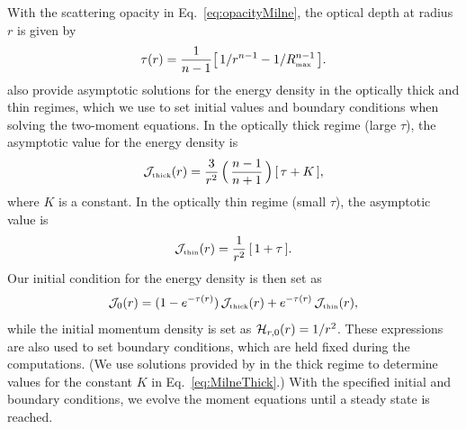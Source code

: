 \documentclass[10pt,preprint]{aastex}
\begin{document}
With the scattering opacity in Eq.~\eqref{eq:opacityMilne}, the optical depth at radius $r$ is given by
\begin{equation}
  \tau(r)=\frac{1}{n-1}\big[\,1/r^{n-1}-1/R_{\mbox{\tiny max}}^{n-1}\,\big].
\end{equation}
\citet{hummerRybicki_1971} also provide asymptotic solutions for the energy density in the optically thick and thin regimes, which we use to set initial values and boundary conditions when solving the two-moment equations.  
In the optically thick regime (large $\tau$), the asymptotic value for the energy density is
\begin{equation}
  \mathcal{J}_{\mbox{\tiny thick}}(r)
  =\frac{3}{r^{2}}\,\Big(\,\frac{n-1}{n+1}\,\Big)\,[\,\tau+K\,], 
  \label{eq:MilneThick}
\end{equation}
where $K$ is a constant.  
In the optically thin regime (small $\tau$), the asymptotic value is
\begin{equation}
  \mathcal{J}_{\mbox{\tiny thin}}(r)
  =\frac{1}{r^{2}}\,[\,1+\tau\,].  
\end{equation}
Our initial condition for the energy density is then set as
\begin{equation}
  \mathcal{J}_{0}(r)
  =(1-e^{-\tau(r)})\,\mathcal{J}_{\mbox{\tiny thick}}(r)+e^{-\tau(r)}\,\mathcal{J}_{\mbox{\tiny thin}}(r),
\end{equation}
while the initial momentum density is set as $\mathcal{H}_{r,0}(r)=1/r^{2}$.  
These expressions are also used to set boundary conditions, which are held fixed during the computations.  
(We use solutions provided by \citet{hummerRybicki_1971} in the thick regime to determine values for the constant $K$ in Eq.~\eqref{eq:MilneThick}.)
With the specified initial and boundary conditions, we evolve the moment equations until a steady state is reached.  
\end{document}
